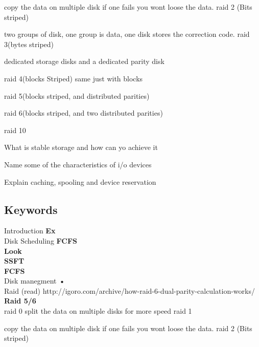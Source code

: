 \documentclass[a4paper,10pt,titlepage]{report}
\begin{document}
		copy the data on multiple disk if one fails you wont loose the data.
	raid 2 (Bits striped)
	
	two groups of disk, one group is data, one disk stores the correction code.
	raid 3(bytes striped)
	
		dedicated storage disks and a dedicated parity disk
		
	raid 4(blocks Striped)
	same just with blocks
	
	raid 5(blocks striped, and distributed parities)
	
	raid 6(blocks striped, and two distributed parities)
	
	
	raid 10
	
	What is stable storage and how can yo achieve it
	
	Name some of the characteristics of i/o devices
	
	Explain caching, spooling and device reservation
	

\subsection{Keywords}
Introduction
\hspace{10mm} \textbf{Ex} \\

Disk Scheduling 
\hspace{15mm} \textbf{FCFS} \\
\hspace{15mm} \textbf{Look} \\
\hspace{15mm} \textbf{SSFT} \\
\hspace{15mm} \textbf{FCFS} \\



Disk manegment 
\hspace{5mm} \textbf{•} \\


Raid (read) http://igoro.com/archive/how-raid-6-dual-parity-calculation-works/
\hspace{5mm} \textbf{Raid 5/6} \\
\hspace{5mm}	raid 0
\hspace{10mm}		split the data on multiple disks for more speed
\hspace{5mm}	raid 1
	
\hspace{10mm}		copy the data on multiple disk if one fails you wont loose the data.
\hspace{5mm}	raid 2 (Bits striped)
	
\end{document}
